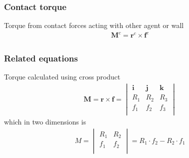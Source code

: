 \subsubsection{Contact torque}
Torque from contact forces acting with other agent or wall
\begin{align}
\mathbf{M}_{}^{c} = \mathbf{r}_{}^{c} \times \mathbf{f}_{}^{c}
\end{align}

\subsubsection{Related equations}
Torque calculated using cross product
\begin{align}
\mathbf{M} = \mathbf{r} \times \mathbf{f} =  \begin{vmatrix} \mathbf{i} & \mathbf{j} & \mathbf{k} \\ R_{1} & R_{2} & R_{3} \\ f_{1} & f_{2} & f_{3} \\ \end{vmatrix} 
\end{align}
which in two dimensions is
\begin{align}
M = \begin{vmatrix} R_{1} & R_{2} \\ f_{1} & f_{2} \\ \end{vmatrix} = R_{1} \cdot f_{2} - R_{2} \cdot f_{1}
\end{align}